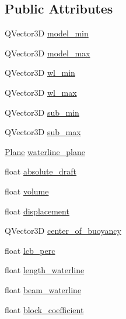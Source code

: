 \subsection*{Public Attributes}
\begin{DoxyCompactItemize}
\item 
Q\-Vector3\-D \hyperlink{structShipCAD_1_1HydrostaticsData_acd93669bc08fa097974d41fbaf4dc81f}{model\-\_\-min}
\item 
Q\-Vector3\-D \hyperlink{structShipCAD_1_1HydrostaticsData_a9319fb2ad054a595b6e3b3fd4059a3ae}{model\-\_\-max}
\item 
Q\-Vector3\-D \hyperlink{structShipCAD_1_1HydrostaticsData_a3bb2750b6306d9e8ae09bb4eebb1ed0c}{wl\-\_\-min}
\item 
Q\-Vector3\-D \hyperlink{structShipCAD_1_1HydrostaticsData_a332be807e8373521c238d82b9dcedc38}{wl\-\_\-max}
\item 
Q\-Vector3\-D \hyperlink{structShipCAD_1_1HydrostaticsData_a2d0a1e5f6bf98f8eceb958e5f7e7c73e}{sub\-\_\-min}
\item 
Q\-Vector3\-D \hyperlink{structShipCAD_1_1HydrostaticsData_ab3a6e316a991426c74673025439f123c}{sub\-\_\-max}
\item 
\hyperlink{classShipCAD_1_1Plane}{Plane} \hyperlink{structShipCAD_1_1HydrostaticsData_af93141f846f6622bb146cda042962303}{waterline\-\_\-plane}
\item 
float \hyperlink{structShipCAD_1_1HydrostaticsData_a6857139c04212164c5557cc816f80345}{absolute\-\_\-draft}
\item 
float \hyperlink{structShipCAD_1_1HydrostaticsData_acfbee81bded1b067a23cfc8cc9c00855}{volume}
\item 
float \hyperlink{structShipCAD_1_1HydrostaticsData_a92d1a8a97eb9b21bad485e40ac4461a0}{displacement}
\item 
Q\-Vector3\-D \hyperlink{structShipCAD_1_1HydrostaticsData_a316b31598f53f036c7008cc4910293f8}{center\-\_\-of\-\_\-buoyancy}
\item 
float \hyperlink{structShipCAD_1_1HydrostaticsData_a783b71d811732bbc002b52f21d63c83a}{lcb\-\_\-perc}
\item 
float \hyperlink{structShipCAD_1_1HydrostaticsData_ae65aa54bcbfb059f11aa174cfaa0447b}{length\-\_\-waterline}
\item 
float \hyperlink{structShipCAD_1_1HydrostaticsData_ab79755f5814572be0dfd3ae3ba214fca}{beam\-\_\-waterline}
\item 
float \hyperlink{structShipCAD_1_1HydrostaticsData_ac59c717b9869f0aacca4305fd81d4882}{block\-\_\-coefficient}

\end{DoxyCompactItemize}
